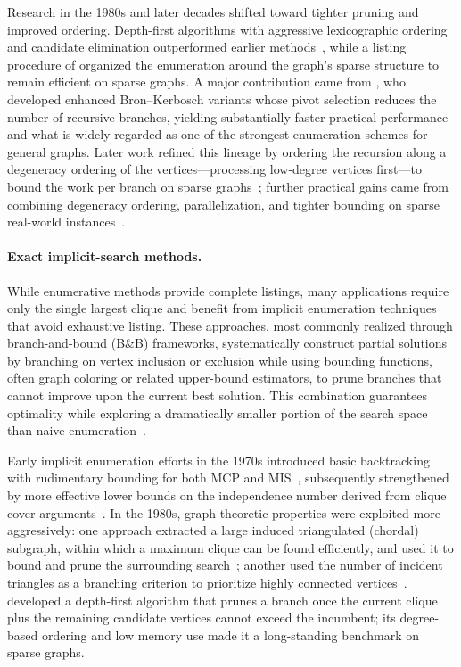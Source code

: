 Research in the 1980s and later decades shifted toward tighter pruning
and improved ordering. Depth-first algorithms with aggressive
lexicographic ordering and candidate elimination outperformed earlier
methods~\citep{loukakis1981}, while a listing procedure of \cite{chiba1985} organized the enumeration around the graph's sparse structure to remain efficient on sparse graphs. A major contribution came from
\cite{TOMITA2006}, who developed enhanced Bron--Kerbosch variants whose pivot selection reduces the number of recursive branches, yielding substantially faster practical performance and what is widely regarded as one of the strongest enumeration schemes for general graphs. Later work refined this lineage by ordering the recursion along a degeneracy ordering of the vertices—processing low-degree vertices first—to bound the work per branch on sparse graphs~\citep{CAZALS2008TCS, Eppstein13}; further practical gains came from combining degeneracy ordering, parallelization, and tighter bounding on sparse real-world instances~\citep{san2018efficiently}.

\paragraph{Exact implicit-search methods.}
While enumerative methods provide complete listings, many applications require only the single largest clique and benefit from implicit enumeration techniques that
avoid exhaustive listing. These approaches, most commonly realized
through branch-and-bound (B\&B) frameworks, systematically construct
partial solutions by branching on vertex inclusion or exclusion while
using bounding functions, often graph coloring or related upper-bound
estimators, to prune branches that cannot improve upon the current
best solution. This combination guarantees optimality while exploring
a dramatically smaller portion of the search space than naive
enumeration~\citep{PardalosXue1994}.

Early implicit enumeration efforts in the 1970s introduced basic
backtracking with rudimentary bounding for both MCP and
MIS~\citep{desler1970, tarjan1972, HouckVemuganti77}, subsequently
strengthened by more effective lower bounds on the independence number
derived from clique cover arguments~\citep{TarjanTrojanowski77}. In
the 1980s, graph-theoretic properties were exploited more aggressively:
one approach extracted a large induced triangulated (chordal) subgraph, within which a maximum clique can be found efficiently, and used it to bound and prune the surrounding search~\citep{BalasYu86}; another used the
number of incident triangles as a branching criterion to prioritize
highly connected vertices~\citep{gendreau1993solving}.
\cite{CarraghanPardalos90} developed a depth-first algorithm that prunes a branch once the current clique plus the remaining candidate vertices cannot exceed the incumbent; its degree-based ordering and low memory use made it a long-standing benchmark on sparse graphs.

